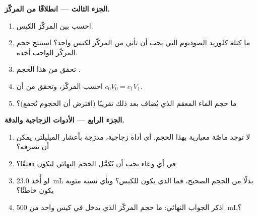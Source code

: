 \begin{problem}
\medskip
\noindent\textbf{الجزء الثالث --- انطلاقًا من  المركّز.}
\begin{enumerate}[resume]
  \item احسب  بين  المركّز 
        الكيس.
  \item ما كتلة كلوريد الصوديوم التي يجب أن تأتي من  المركّز لكيس
        واحد؟ استنتج حجم  المركّز الواجب
        أخذه.
  \item تحقق من هذا الحجم .
  \item احسب   المركّز، وتحقق
        من أن $c_0 V_0 = c_1 V_1$.
  \item ما حجم الماء المعقم الذي يُضاف بعد ذلك تقريبًا (افترض أن الحجوم
        تُجمع)؟
\end{enumerate}

\medskip
\noindent\textbf{الجزء الرابع --- الأدوات الزجاجية والدقة.}
\begin{enumerate}[resume]
  \item لا توجد ماصّة معيارية بهذا الحجم. أي أداة زجاجية، مدرّجة بأعشار
        الميليلتر، يمكن أن تصرفه؟
  \item في أي وعاء يجب أن يُكمَّل الحجم النهائي ليكون
        دقيقًا؟
  \item لو أُخذ \qty{23.0}{mL} بدلًا من الحجم الصحيح، فما 
        الذي يكون للكيس؟ وبأي نسبة مئوية يكون خاطئًا؟
  \item اذكر الجواب النهائي: ما حجم  المركّز الذي يدخل في كيس واحد
        من \qty{500}{mL}؟
\end{enumerate}
\end{problem}

